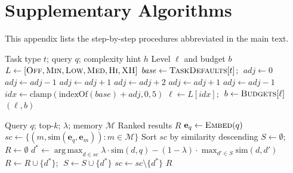\documentclass{article}
\theoremstyle{plain}
\theoremstyle{definition}
\DeclareMathOperator*{\argmax}{arg\,max}
\begin{document}
\section{Supplementary Algorithms}\label{app:algs}

This appendix lists the step-by-step procedures abbreviated in the main text.

\begin{algorithm}[ht!]
\caption{Adaptive Thinking Level Selection (\S\ref{sec:thinking})}
\label{alg:thinking}
\begin{algorithmic}
\REQUIRE Task type $t$; query $q$; complexity hint $h$
\ENSURE Level $\ell$ and budget $b$
\STATE $L \leftarrow [\textsc{Off}, \textsc{Min}, \textsc{Low}, \textsc{Med}, \textsc{Hi}, \textsc{XH}]$
\STATE $\mathit{base} \leftarrow \textsc{TaskDefaults}[t]$; $\;\mathit{adj} \leftarrow 0$
 \STATE $\mathit{adj} \leftarrow \mathit{adj} - 1$ \ENDIF
{} \STATE $\mathit{adj} \leftarrow \mathit{adj} + 1$ \ENDIF
{} \STATE $\mathit{adj} \leftarrow \mathit{adj} + 2$ \ENDIF
{} \STATE $\mathit{adj} \leftarrow \mathit{adj} + 1$ \ENDIF
{} \STATE $\mathit{adj} \leftarrow \mathit{adj} - 1$ \ENDIF
\STATE $\mathit{idx} \leftarrow \mathrm{clamp}(\mathrm{indexOf}(\mathit{base}) + \mathit{adj}, 0, 5)$
\STATE $\ell \leftarrow L[\mathit{idx}]$; $\;b \leftarrow \textsc{Budgets}[\ell]$
\RETURN $(\ell, b)$
\end{algorithmic}
\end{algorithm}

\begin{algorithm}[ht!]
\caption{MMR-Enhanced Semantic Memory Search (\S\ref{sec:memory})}
\label{alg:mmr}
\begin{algorithmic}
\REQUIRE Query $q$; top-$k$; $\lambda$; memory $\mathcal{M}$
\ENSURE Ranked results $R$
\STATE $\mathbf{e}_q \leftarrow \textsc{Embed}(q)$
\STATE $\mathit{sc} \leftarrow \{(m, \mathrm{sim}(\mathbf{e}_q, \mathbf{e}_m)) : m \in \mathcal{M}\}$
\STATE Sort $\mathit{sc}$ by similarity descending
\STATE $S \leftarrow \emptyset$; $R \leftarrow \emptyset$
  \STATE $d^* \!\leftarrow\! \argmax_{d \in \mathit{sc}} \lambda \cdot \mathrm{sim}(d, q) - (1{-}\lambda) \cdot \max_{d' \in S}\mathrm{sim}(d, d')$
  \STATE $R \leftarrow R \cup \{d^*\}$; $\;S \leftarrow S \cup \{d^*\}$
  \STATE $\mathit{sc} \leftarrow \mathit{sc} \setminus \{d^*\}$
\ENDWHILE
\RETURN $R$
\end{algorithmic}
\end{algorithm}
\end{document}
